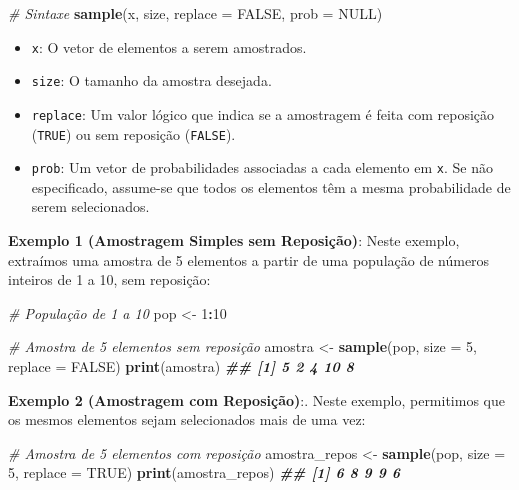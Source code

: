 \documentclass[
]{book}
\newenvironment{Shaded}{\begin{snugshade}}{\end{snugshade}}
\newcommand{\AttributeTok}[1]{\textcolor[rgb]{0.13,0.29,0.53}{#1}}
\newcommand{\CommentTok}[1]{\textcolor[rgb]{0.56,0.35,0.01}{\textit{#1}}}
\newcommand{\ConstantTok}[1]{\textcolor[rgb]{0.56,0.35,0.01}{#1}}
\newcommand{\DecValTok}[1]{\textcolor[rgb]{0.00,0.00,0.81}{#1}}
\newcommand{\DocumentationTok}[1]{\textcolor[rgb]{0.56,0.35,0.01}{\textbf{\textit{#1}}}}
\newcommand{\FunctionTok}[1]{\textcolor[rgb]{0.13,0.29,0.53}{\textbf{#1}}}
\newcommand{\NormalTok}[1]{#1}
\newcommand{\OtherTok}[1]{\textcolor[rgb]{0.56,0.35,0.01}{#1}}
\newcommand{\SpecialCharTok}[1]{\textcolor[rgb]{0.81,0.36,0.00}{\textbf{#1}}}
\providecommand{\tightlist}{%
  \setlength{\itemsep}{0pt}\setlength{\parskip}{0pt}}
\begin{document}
\begin{Shaded}
\begin{Highlighting}[]
\CommentTok{\# Sintaxe}
\FunctionTok{sample}\NormalTok{(x, size, }\AttributeTok{replace =} \ConstantTok{FALSE}\NormalTok{, }\AttributeTok{prob =} \ConstantTok{NULL}\NormalTok{)}
\end{Highlighting}
\end{Shaded}

\begin{itemize}
\tightlist
\item
  \texttt{x}: O vetor de elementos a serem amostrados.
\item
  \texttt{size}: O tamanho da amostra desejada.
\item
  \texttt{replace}: Um valor lógico que indica se a amostragem é feita com
  reposição (\texttt{TRUE}) ou sem reposição (\texttt{FALSE}).
\item
  \texttt{prob}: Um vetor de probabilidades associadas a cada elemento em
  \texttt{x}. Se não especificado, assume-se que todos os elementos têm a
  mesma probabilidade de serem selecionados.
\end{itemize}

\textbf{Exemplo 1 (Amostragem Simples sem Reposição)}: Neste exemplo,
extraímos uma amostra de 5 elementos a partir de uma população de
números inteiros de 1 a 10, sem reposição:

\begin{Shaded}
\begin{Highlighting}[]
\CommentTok{\# População de 1 a 10}
\NormalTok{pop }\OtherTok{\textless{}{-}} \DecValTok{1}\SpecialCharTok{:}\DecValTok{10}

\CommentTok{\# Amostra de 5 elementos sem reposição}
\NormalTok{amostra }\OtherTok{\textless{}{-}} \FunctionTok{sample}\NormalTok{(pop, }\AttributeTok{size =} \DecValTok{5}\NormalTok{, }\AttributeTok{replace =} \ConstantTok{FALSE}\NormalTok{)}
\FunctionTok{print}\NormalTok{(amostra)}
\DocumentationTok{\#\# [1]  5  2  4 10  8}
\end{Highlighting}
\end{Shaded}

\textbf{Exemplo 2 (Amostragem com Reposição)}:. Neste exemplo, permitimos que
os mesmos elementos sejam selecionados mais de uma vez:

\begin{Shaded}
\begin{Highlighting}[]
\CommentTok{\# Amostra de 5 elementos com reposição}
\NormalTok{amostra\_repos }\OtherTok{\textless{}{-}} \FunctionTok{sample}\NormalTok{(pop, }\AttributeTok{size =} \DecValTok{5}\NormalTok{, }\AttributeTok{replace =} \ConstantTok{TRUE}\NormalTok{)}
\FunctionTok{print}\NormalTok{(amostra\_repos)}
\DocumentationTok{\#\# [1] 6 8 9 9 6}
\end{Highlighting}
\end{Shaded}
\end{document}
